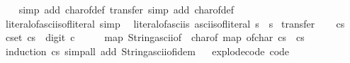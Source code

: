\begin{isabellebody}
%
\isadelimproof
\ \ %
\endisadelimproof
%
\isatagproof
{}\isamarkupfalse%
\ {\isacharparenleft}{\kern0pt}simp\ add{\isacharcolon}{\kern0pt}\ char{\isacharunderscore}{\kern0pt}of{\isacharunderscore}{\kern0pt}def{\isacharparenright}{\kern0pt}\ {\isacharparenleft}{\kern0pt}transfer{\isacharcomma}{\kern0pt}\ simp\ add{\isacharcolon}{\kern0pt}\ char{\isacharunderscore}{\kern0pt}of{\isacharunderscore}{\kern0pt}def{\isacharparenright}{\kern0pt}\isanewline
\isanewline
{}%
\endisatagproof
{\isafoldproof}%
%
\isadelimproof
%
\endisadelimproof
\ \isamarkupfalse%
\ literal{\isacharunderscore}{\kern0pt}of{\isacharunderscore}{\kern0pt}asciis{\isacharunderscore}{\kern0pt}of{\isacharunderscore}{\kern0pt}literal\ {\isacharbrackleft}{\kern0pt}simp{\isacharbrackright}{\kern0pt}{\isacharcolon}{\kern0pt}\isanewline
\ \ {\isachardoublequoteopen}literal{\isacharunderscore}{\kern0pt}of{\isacharunderscore}{\kern0pt}asciis\ {\isacharparenleft}{\kern0pt}asciis{\isacharunderscore}{\kern0pt}of{\isacharunderscore}{\kern0pt}literal\ s{\isacharparenright}{\kern0pt}\ {\isacharequal}{\kern0pt}\ s{\isachardoublequoteclose}\isanewline
%
\isadelimproof
%
\endisadelimproof
%
\isatagproof
{}\isamarkupfalse%
\ transfer\isanewline
\ \ \isamarkupfalse%
\ cs\isanewline
\ \ \isamarkupfalse%
\ {\isachardoublequoteopen}{\isasymforall}c{\isasymin}set\ cs{\isachardot}{\kern0pt}\ {\isasymnot}\ digit{}\ c{\isachardoublequoteclose}\isanewline
\ \ \isamarkupfalse%
\ \isamarkupfalse%
\ {\isachardoublequoteopen}map\ {\isacharparenleft}{\kern0pt}String{\isachardot}{\kern0pt}ascii{\isacharunderscore}{\kern0pt}of\ {\isasymcirc}\ char{\isacharunderscore}{\kern0pt}of{\isacharparenright}{\kern0pt}\ {\isacharparenleft}{\kern0pt}map\ of{\isacharunderscore}{\kern0pt}char\ cs{\isacharparenright}{\kern0pt}\ {\isacharequal}{\kern0pt}\ cs{\isachardoublequoteclose}\isanewline
\ \ \ \ \isamarkupfalse%
\ {\isacharparenleft}{\kern0pt}induction\ cs{\isacharparenright}{\kern0pt}\ {\isacharparenleft}{\kern0pt}simp{\isacharunderscore}{\kern0pt}all\ add{\isacharcolon}{\kern0pt}\ String{\isachardot}{\kern0pt}ascii{\isacharunderscore}{\kern0pt}of{\isacharunderscore}{\kern0pt}idem{\isacharparenright}{\kern0pt}\isanewline
{}\isamarkupfalse%
\isanewline
\isanewline
{}%
\endisatagproof
{\isafoldproof}%
%
\isadelimproof
%
\endisadelimproof
\ \isamarkupfalse%
\ explode{\isacharunderscore}{\kern0pt}code\ {\isacharbrackleft}{\kern0pt}code{\isacharbrackright}{\kern0pt}{\isacharcolon}{\kern0pt}\isanewline

\end{isabellebody}
